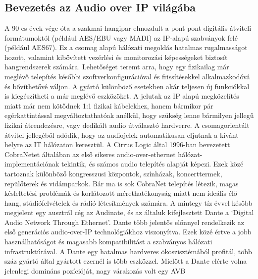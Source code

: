 \chapter{\AudioOverIp}
\section{Bevezetés az Audio over IP világába}
A 90-es évek vége óta a szakmai hangipar elmozdult a pont-pont digitális
átviteli formátumoktól (például AES/EBU vagy MADI) az IP-alapú szabványok felé
(például AES67). Ez a csomag alapú hálózati megoldás hatalmas rugalmasságot
hozott, valamint kibővített vezérlési és monitorozási képességeket biztosít
hangrendszerek számára. Lehetőséget teremt arra, hogy egy fizikailag már meglévő
telepítés későbbi szoftverkonfigurációval és frissítésekkel alkalmazkodóvá és
bővíthetővé váljon. A gyártó különböző esetekben akár teljesen új funkciókkal is
kiegészítheti a már meglévő eszközöket. 
A jelutak az IP alapú megközelítés miatt már nem kötődnek 1:1 fizikai kábelekhez, hanem
bármikor pár egérkattintással megváltoztathatóak anélkül, hogy szükség lenne bármilyen
jellegű fizikai átrendezésre, vagy dedikált audio útválasztó hardverre. 
A csomagorientált átvitel jellegéből adódik, hogy az audiojelek automatikusan eljutnak 
a kívánt helyre az IT hálózaton keresztül.
A Cirrus Logic által 1996-ban bevezetett CobraNetet
általában az első sikeres audio-over-ethernet hálózat-implementációnak tekintik,
és számos audio telepítés alapját képezi. Ezek közé tartoznak különböző kongresszusi központok,
színházak, koncerttermek, repülőterek és vidámparkok.
Bár ma is sok CobraNet telepítés létezik, magas késleltetési problémák és korlátozott mérethatékonyság
miatt nem ideális élő hang, stúdiófelvételek és rádió létesítmények számára.
A mintegy tíz évvel később megjelent egy ausztrál cég az Audinate, és az általuk kifejlesztett
Dante a `Digital Audio Network Through Ethernet'. Dante több jelentős
előnnyel rendelkezik az első generációs audio-over-IP technológiákhoz viszonyítva.
Ezek közé értve a jobb használhatóságot és magasabb kompatibilitást a szabványos
hálózati infrastruktúrával. A Dante egy hatalmas hardveres ökoszisztémából
profitál, több száz gyártó által gyártott ezernél is több eszközzel. 
Mielőtt a Dante elérte volna jelenlegi domináns pozícióját, nagy várakozás volt egy AVB
